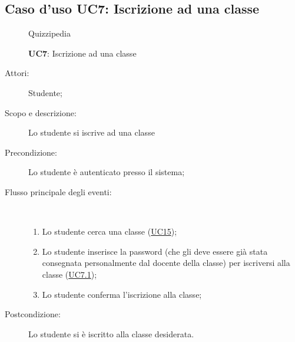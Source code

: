\subsection{Caso d'uso UC7: Iscrizione ad una classe}
\begin{figure}[H]
	\centering
	\begin{resizedtikzpicture}{\textwidth}
		\begin{umlsystem}[x=0, fill=lightgray!20]{Quizzipedia}
		\end{umlsystem}
	\end{resizedtikzpicture}
	\caption{\textbf{UC7}: Iscrizione ad una classe}
	\label{UC7}
\end{figure}
\begin{description}
	\item[Attori:] Studente;
	\item[Scopo e descrizione:] Lo studente si iscrive ad una classe
	\item[Precondizione:] Lo studente è autenticato presso il sistema;
	
	\item[Flusso principale degli eventi:] \ 
	\begin{enumerate}
		\item Lo studente cerca una classe (\hyperlink{UC15}{UC15});
		\item Lo studente inserisce la password (che gli deve essere già stata consegnata personalmente dal docente della classe) per iscriversi alla classe (\hyperlink{UC7.1}{UC7.1});
		\item Lo studente conferma l'iscrizione alla classe;
		
	\end{enumerate}
	\item[Postcondizione:] Lo studente si è iscritto alla classe desiderata.
\end{description}
\hypertarget{UC7.1}{}
